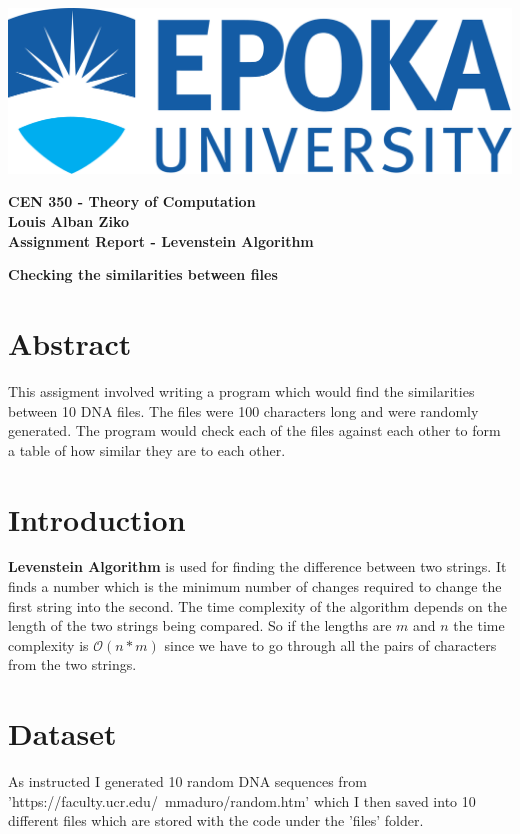 \documentclass[]{article}
\newcommand\tab[1][1cm]{\hspace*{#1}}
\begin{document}
\includegraphics[scale=0.1]{res/epoka.png}
\\
\begin{center}
	\begin{large}
		\textbf{
		CEN 350 - Theory of Computation\\
		Louis Alban Ziko\\
		Assignment Report - Levenstein Algorithm\\
		}
	\end{large}
	\begin{small}
		\textbf{Checking the similarities between files\\}
	\end{small}
\end{center}
\section{Abstract}
\tab This assigment involved writing a program which would find the
similarities between 10 DNA files. The files were 100 characters long 
and were randomly generated. The program would check each of the files
against each other to form a table of how similar they are to each other.

\section{Introduction}
\tab \textbf{Levenstein Algorithm} is used for finding the difference between
two strings. It finds a number which is the minimum number of changes required
to change the first string into the second. The time complexity of the algorithm
depends on the length of the two strings being compared. So if the lengths are 
$m$ and $n$ the time complexity is $\mathcal{O}(n*m)$ since we have to go through
all the pairs of characters from the two strings.

\section{Dataset}
\tab As instructed I generated 10 random DNA sequences from 'https://faculty.ucr.edu/~mmaduro/random.htm'
which I then saved into 10 different files which are stored with the code under
the 'files' folder.
\end{document}
